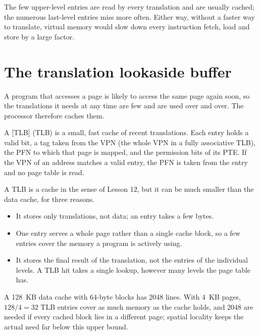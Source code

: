 \documentclass[../main.tex]{subfiles}
\begin{document}
The few upper-level entries are read by every translation and are usually
cached; the numerous last-level entries miss more often.  Either way, without
a faster way to translate, virtual memory would slow down every instruction
fetch, load and store by a large factor.

\section{The translation lookaside buffer}
\label{sec:l13-tlb}

A program that accesses a page is likely to access the same page again soon,
so the translations it needs at any time are few and are used over and
over.  The processor therefore
caches them.

\begin{definition}
  A [TLB]%
   (TLB) is a small, fast cache of
  recent translations.  Each entry holds a valid bit, a tag taken from the VPN
  (the whole VPN in a fully associative TLB), the PFN to which that page is
  mapped, and the permission bits of its PTE.  If the VPN of an address matches a
  valid entry, the PFN is taken from the entry and no page table is read.
\end{definition}

A TLB is a cache in the sense of Lesson 12, but it can be much smaller than
the data cache, for three reasons.
\begin{itemize}
  \item It stores only translations, not data; an entry takes a few bytes.
  \item One entry serves a whole page rather than a single cache block, so a
    few entries cover the memory a program is actively using.
  \item It stores the final result of the translation, not the entries of the
    individual levels.  A TLB hit takes a single lookup, however many levels
    the page table has.
\end{itemize}

\begin{example}
  \label{ex:l13-tlb-size}
  A 128~KB data cache with 64-byte blocks has 2048 lines.  With 4~KB pages,
  $128/4 = 32$ TLB entries cover as much memory as the cache holds, and 2048
  are needed if every cached block lies in a different page; spatial locality
  keeps the actual need far below this upper bound.
\end{example}
\end{document}
